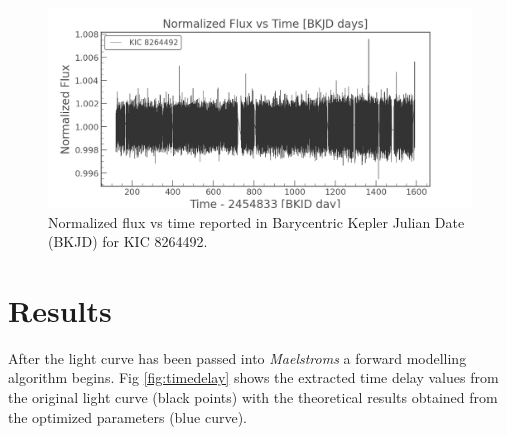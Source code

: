 \documentclass[]{article}
\begin{document}
\begin{figure}[H]
    \centering
    \includegraphics[width=1\linewidth]{Lightcurve.png}
    \caption{Normalized flux vs time reported in Barycentric Kepler Julian Date (BKJD) for KIC 8264492.}
    \label{fig:Lightcurve}
\end{figure}


\section{Results}
After the light curve has been passed into \textit{Maelstroms} a forward modelling algorithm begins. 
Fig \ref{fig:timedelay} shows the extracted time delay values from the original light curve (black points) with the theoretical results obtained from the optimized parameters (blue curve).
\end{document}
